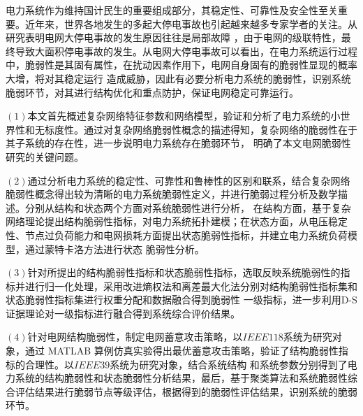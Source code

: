 \begin{cabstract}
电力系统作为维持国计民生的重要组成部分，其稳定性、可靠性及安全性至关重要。近年来，世界各地发生的多起大停电事故也引起越来越多专家学者的关注。从研究表明电网大停电事故的发生原因往往是局部故障
，由于电网的级联特性，最终导致大面积停电事故的发生。从电网大停电事故可以看出，在电力系统运行过程中，脆弱性是其固有属性，在扰动因素作用下，电网自身固有的脆弱性显现的概率大增，将对其稳定运行
造成威胁，因此有必要分析电力系统的脆弱性，识别系统脆弱环节，对其进行结构优化和重点防护，保证电网稳定可靠运行。

$(1)$本文首先概述复杂网络特征参数和网络模型，验证和分析了电力系统的小世界性和无标度性。通过对复杂网络脆弱性概念的描述得知，复杂网络的脆弱性在于其子系统的存在性，进一步说明电力系统存在脆弱环节，
明确了本文电网脆弱性研究的关键问题。

$(2)$通过分析电力系统的稳定性、可靠性和鲁棒性的区别和联系，结合复杂网络脆弱性概念得出较为清晰的电力系统脆弱性定义，并进行脆弱过程分析及数学描述。分别从结构和状态两个方面对系统脆弱性进行分析，
在结构方面，基于复杂网络理论提出结构脆弱性指标，对电力系统拓扑建模；在状态方面，从电压稳定性、节点过负荷能力和电网损耗方面提出状态脆弱性指标，并建立电力系统负荷模型，通过蒙特卡洛方法进行状态
脆弱性分析。

$(3)$针对所提出的结构脆弱性指标和状态脆弱性指标，选取反映系统脆弱性的指标并进行归一化处理，采用改进熵权法和离差最大化法分别对结构脆弱性指标集和状态脆弱性指标集进行权重分配和数据融合得到脆弱性
一级指标，进一步利用D-S证据理论对一级指标进行融合得到系统综合评价结果。

$(4)$针对电网结构脆弱性，制定电网蓄意攻击策略，以$IEEE118$系统为研究对象，通过 MATLAB 算例仿真实验得出最优蓄意攻击策略，验证了结构脆弱性指标的合理性。以$IEEE39$系统为研究对象，结合系统结构
和系统参数分别得到了电力系统的结构脆弱性和状态脆弱性分析结果，最后，基于聚类算法和系统脆弱性综合评估结果进行脆弱节点等级评估，根据得到的脆弱性评估结果，识别系统的脆弱环节。



\end{cabstract}


\begin{eabstract}

\end{eabstract}

\ekeywords{} 